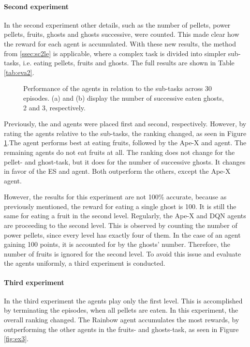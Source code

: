 \paragraph{Second experiment}
In the second experiment other details, such as the number of pellets, power pellets, fruits, ghosts and ghosts successive, were counted. This made clear how the reward for each agent is accumulated. With these new results, the method from \ref{ssec:sc2le} is applicable, where a complex task is divided into simpler sub-tasks, i.e. eating pellets, fruits and ghosts. The full results are shown in Table \ref{tab:eva2}.
\begin{figure}[H]
	\centering
	\smallskip
	\qquad
	\caption[Performance in sub-tasks]{Performance of the agents in relation to the sub-tasks across 30 episodes. (a) and (b) display the number of successive eaten ghosts, 2 and 3, respectively. }
	\label{fig:ex2}
\end{figure}

Previously, the  and  agents were placed first and second, respectively. However, by rating the agents relative to the sub-tasks, the ranking changed, as seen in Figure \ref{fig:ex2}.The  agent performs best at eating fruits, followed by the Ape-X and  agent. The remaining agents do not eat fruits at all. The ranking does not change for the pellet- and ghost-task, but it does for the number of successive ghosts. It changes in favor of the ES and  agent. Both outperform the others, except the Ape-X agent. 

However, the results for this experiment are not 100\% accurate, because as previously mentioned, the reward for eating a single ghost is 100. It is still the same for eating a fruit in the second level. Regularly, the Ape-X and DQN agents are proceeding to the second level. This is observed by counting the number of power pellets, since every level has exactly four of them. In the case of an agent gaining 100 points, it is accounted for by the ghosts' number. Therefore, the number of fruits is ignored for the second level. To avoid this issue and evaluate the agents uniformly, a third experiment is conducted.

\paragraph{Third experiment}
In the third experiment the agents play only the first level. This is accomplished by terminating the episodes, when all pellets are eaten. In this experiment, the overall ranking changed. The Rainbow agent accumulates the most rewards, by outperforming the other agents in the fruits- and ghosts-task, as seen in Figure \ref{fig:ex3}.


